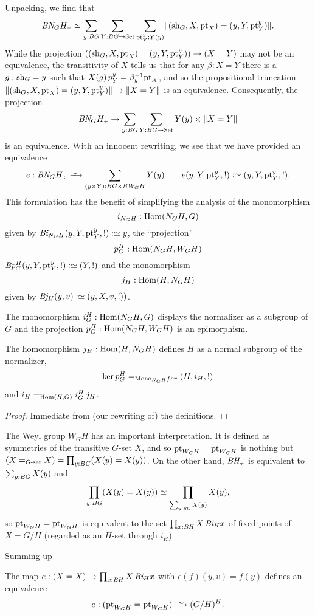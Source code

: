 Unpacking, we find that
$$\BN_GH_\div\oldequiv \sum_{y:\BG}\sum_{Y:\BG\to\Set}\sum_{\pt^y_Y:Y(y)} \Trunc{(\shape_G,X,\pt_X)=(y,Y,\pt^y_Y)}.$$
While the projection $((\mathrm{sh}_G,X,\mathrm{pt}_X)=(y,Y,\mathrm{pt}^y_Y))\to (X=Y)$ may not be an equivalence, the transitivity of $X$ tells us that for any $\beta:X=Y$ there is a $g:\mathrm{sh}_G=y$ such that $X(g)\,p^y_Y=\beta^{-1}_y\mathrm{pt}_X$, and so the propositional truncation $\lVert(\mathrm{sh}_G,X,\mathrm{pt}_X)=(y,Y,\mathrm{pt}^y_Y)\rVert \to \lVert X=Y\rVert$ is an equivalence.
Consequently, the projection
$$\BN_GH_\div\to \sum_{y:\BG}\sum_{Y:\BG\to\Set}Y(y)\times\Trunc{X=Y}$$
is an equivalence.  With an innocent rewriting, we see that we have provided an equivalence
$$e:\BN_GH_\div\we\sum_{(y\times Y):\BG\times \BW_GH}Y(y)\qquad e(y,Y,\pt^y_Y,!)\defequi (y,Y,\pt^y_Y,!).$$
This formulation has the benefit of simplifying the analysis of the monomorphism
$$i_{N_GH}:\Hom(N_GH,G)$$
given by $\Bi_{N_GH}(y,Y,\pt^y_Y,!)\defequi y$, the ``projection''
 $$p_G^H:\Hom(N_GH,W_GH)$$
$\Bp_G^H(y,Y,\pt^y_Y,!)\defequi (Y,!)$ and the monomorphism
$$j_H:\Hom(H,N_GH)$$
given by $\Bj_H(y,v)\defequi(y,X,v,!))$.




\begin{lemma}
  The monomorphism $i_G^H:\Hom(N_GH,G)$ displays the normalizer as a subgroup of $G$ and the projection $p_G^H:\Hom(N_GH,W_GH)$ is an epimorphism.

The homomorphism $j_H:\Hom(H,N_GH)$ defines $H$ as a normal subgroup of the normalizer,
$$\ker p_G^H=_{\typemono_{N_GH}for}(H,i_H,!)$$
and $i_H=_{\Hom(H,G)}i_G^H\,j_H$.
\end{lemma}
\begin{proof}
  Immediate from (our rewriting of) the definitions.
\end{proof}

The Weyl group $W_GH$ has an important interpretation.  It is defined as symmetries of the transitive $G$-set $X$, and so $\mathrm{pt}_{W_GH}=\mathrm{pt}_{W_GH}$ is nothing but $(X=_{G\text{-set}}X)=\prod_{y:\mathit{B}\mathit{G}}(X(y)=X(y))$.  On the other hand, $\BH_\div$ is equivalent to $\sum_{y:\mathit{B}\mathit{G}}X(y)$ and
$$\prod_{y:\mathit{B}\mathit{G}}(X(y)=X(y))\simeq \prod_{\sum_{y:\mathit{B}\mathit{G}}X(y)}X(y),$$ so $\mathrm{pt}_{W_GH}=\mathrm{pt}_{W_GH}$ is equivalent to the set $%
\prod_{x:\BH}X\, \Bi_Hx$ of fixed points of $X=G/H$ (regarded as an $H$-set through $i_H$).

Summing up
\begin{lemma}
  \label{lem:WGHisHfixofG/H}
  The map  $e:(X=X)\to \prod_{x:\mathit{B}\mathit{H}}X\, \mathit{B}\mathit{i}_Hx$ with $e(f)(y,v)=f(y)$ defines an equivalence
$$e:(\pt_{W_GH}=\pt_{W_GH})\we (G/H)^H.$$
\end{lemma}


